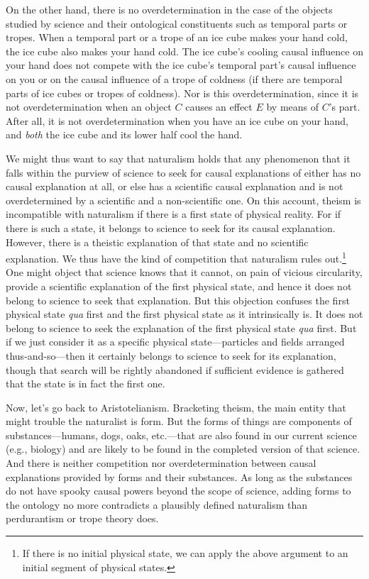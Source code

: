 On the other hand, there is no overdetermination in the case of the objects studied by science and their ontological
constituents such as temporal parts or tropes. When a temporal part or a trope of an ice cube makes 
your hand cold, the ice cube also makes your hand cold. The ice cube's cooling causal influence on your hand
does not compete with the ice cube's temporal part's causal influence on you or on the causal influence of 
a trope of coldness (if there are temporal parts of ice cubes or tropes of coldness). Nor is this overdetermination,
since it is not overdetermination when an object $C$ causes an effect $E$ by means of $C$'s part. After all,
it is not overdetermination when you have an ice cube on your hand, and \textit{both} the ice cube and its lower half
cool the hand.

We might thus want to say that naturalism holds that any phenomenon that it falls within the purview of science 
to seek for causal explanations of either has no causal explanation at all, or else has a scientific causal explanation 
and is not overdetermined by a scientific and a non-scientific one. On this account, theism is incompatible with
naturalism if there is a first state of physical reality. For if there is such a state, it belongs
to science to seek for its causal explanation. However, there is a theistic explanation of that state and no 
scientific explanation. We thus have the kind of competition that naturalism rules out.\footnote{If there is 
no initial physical state, we can apply the above argument to an initial
segment of physical states.} One might object that science knows that it cannot, on pain
of vicious circularity, provide a scientific explanation of the first physical state, and hence it does not belong to
science to seek that explanation. But this objection confuses the first physical state \textit{qua} first and the
first physical state as it intrinsically is. It does not belong to science to seek the explanation of the first physical
state \textit{qua} first. But if we just consider it as a specific physical state---particles and fields arranged thus-and-so---then
it certainly belongs to science to seek for its explanation, though that search will be rightly abandoned if sufficient evidence
is gathered that the state is in fact the first one.

Now, let's go back to Aristotelianism. Bracketing theism, the main entity that might trouble the naturalist is form.
But the forms of things are components of substances---humans, dogs, oaks, etc.---that are also found in our current
science (e.g., biology) and are likely to be found in the completed version of that science. And there is neither
competition nor overdetermination between causal explanations provided by
forms and their substances. As long as the substances do not have spooky causal powers beyond the scope of science,
adding forms to the ontology no more contradicts a plausibly defined naturalism than perdurantism or trope theory
does.


